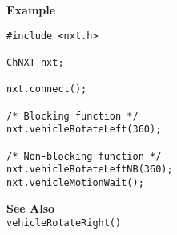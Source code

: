 \noindent
{\bf Example}
\begin{lstlisting}
#include <nxt.h>

ChNXT nxt;

nxt.connect();

/* Blocking function */
nxt.vehicleRotateLeft(360);

/* Non-blocking function */
nxt.vehicleRotateLeftNB(360);
nxt.vehicleMotionWait();
\end{lstlisting}

\noindent
{\bf See Also}\\
\texttt{vehicleRotateRight()}


